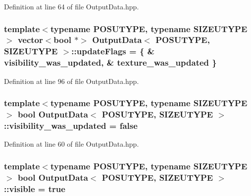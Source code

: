 Definition at line 64 of file Output\-Data.\-hpp.

\hypertarget{struct_output_data_a490cb05683b60fb16e696652b0c040d6}{
\subsubsection[{update\-Flags}]{\setlength{\rightskip}{0pt plus 5cm}template$<$typename P\-O\-S\-U\-T\-Y\-P\-E, typename S\-I\-Z\-E\-U\-T\-Y\-P\-E$>$ vector$<$bool $\ast$$>$ {\bf Output\-Data}$<$ P\-O\-S\-U\-T\-Y\-P\-E, S\-I\-Z\-E\-U\-T\-Y\-P\-E $>$\-::update\-Flags = \{ \& {\bf visibility\-\_\-was\-\_\-updated}, \& {\bf texture\-\_\-was\-\_\-updated} \}\hspace{0.3cm}{\ttfamily [protected]}}}\label{struct_output_data_a490cb05683b60fb16e696652b0c040d6}


Definition at line 96 of file Output\-Data.\-hpp.

\hypertarget{struct_output_data_a0f15b2dc64531dfd8dd0925840c4758e}{
\subsubsection[{visibility\-\_\-was\-\_\-updated}]{\setlength{\rightskip}{0pt plus 5cm}template$<$typename P\-O\-S\-U\-T\-Y\-P\-E, typename S\-I\-Z\-E\-U\-T\-Y\-P\-E$>$ bool {\bf Output\-Data}$<$ P\-O\-S\-U\-T\-Y\-P\-E, S\-I\-Z\-E\-U\-T\-Y\-P\-E $>$\-::visibility\-\_\-was\-\_\-updated = false\hspace{0.3cm}{\ttfamily [protected]}}}\label{struct_output_data_a0f15b2dc64531dfd8dd0925840c4758e}


Definition at line 60 of file Output\-Data.\-hpp.

\hypertarget{struct_output_data_ab1d5abc732db0f826a01afbea44ada34}{
\subsubsection[{visible}]{\setlength{\rightskip}{0pt plus 5cm}template$<$typename P\-O\-S\-U\-T\-Y\-P\-E, typename S\-I\-Z\-E\-U\-T\-Y\-P\-E$>$ bool {\bf Output\-Data}$<$ P\-O\-S\-U\-T\-Y\-P\-E, S\-I\-Z\-E\-U\-T\-Y\-P\-E $>$\-::visible = true\hspace{0.3cm}{\ttfamily [protected]}}}\label{struct_output_data_ab1d5abc732db0f826a01afbea44ada34}


